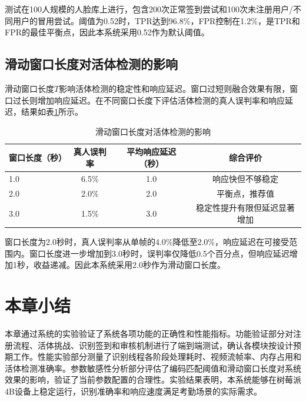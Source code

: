 测试在100人规模的人脸库上进行，包含200次正常签到尝试和100次未注册用户/不同用户的冒用尝试。阈值为0.52时，TPR达到96.8\%，FPR控制在1.2\%，是TPR和FPR的最佳平衡点，因此本系统采用0.52作为默认阈值。

\subsection{滑动窗口长度对活体检测的影响}

滑动窗口长度$T$影响活体检测的稳定性和响应延迟。窗口过短则融合效果有限，窗口过长则增加响应延迟。在不同窗口长度下评估活体检测的真人误判率和响应延迟，结果如表\ref{tab:window}所示。

\begin{table}[htbp]
    \centering
    \caption{滑动窗口长度对活体检测的影响}
    \label{tab:window}
    \begin{tabular}{lccc}
        \toprule
        \textbf{窗口长度（秒）} & \textbf{真人误判率} & \textbf{平均响应延迟（秒）} & \textbf{综合评价} \\
        \midrule
        1.0 & 6.5\% & 1.0 & 响应快但不够稳定 \\
        2.0 & 2.0\% & 2.0 & 平衡点，推荐值 \\
        3.0 & 1.5\% & 3.0 & 稳定性提升有限但延迟显著增加 \\
        \bottomrule
    \end{tabular}
\end{table}

窗口长度为2.0秒时，真人误判率从单帧的4.0\%降低至2.0\%，响应延迟在可接受范围内。窗口长度进一步增加到3.0秒时，误判率仅降低0.5个百分点，但响应延迟增加1秒，收益递减。因此本系统采用2.0秒作为滑动窗口长度。

\section{本章小结}

本章通过系统的实验验证了系统各项功能的正确性和性能指标。功能验证部分对注册流程、活体挑战、识别签到和审核机制进行了端到端测试，确认各模块按设计预期工作。性能实验部分测量了识别线程各阶段处理耗时、视频流帧率、内存占用和活体检测准确率。参数敏感性分析部分评估了编码匹配阈值和滑动窗口长度对系统效果的影响，验证了当前参数配置的合理性。实验结果表明，本系统能够在树莓派4B设备上稳定运行，识别准确率和响应速度满足考勤场景的实际需求。
